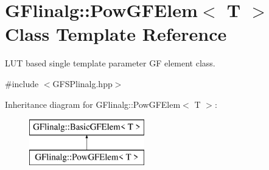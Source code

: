 \hypertarget{class_g_flinalg_1_1_pow_g_f_elem}{}\section{G\+Flinalg\+::Pow\+G\+F\+Elem$<$ T $>$ Class Template Reference}
\label{class_g_flinalg_1_1_pow_g_f_elem}


L\+UT based single template parameter GF element class.  




{\ttfamily \#include $<$G\+F\+S\+Plinalg.\+hpp$>$}

Inheritance diagram for G\+Flinalg\+::Pow\+G\+F\+Elem$<$ T $>$\+:\begin{figure}[H]
\begin{center}
\leavevmode
\includegraphics[height=2.000000cm]{class_g_flinalg_1_1_pow_g_f_elem}
\end{center}
\end{figure}
